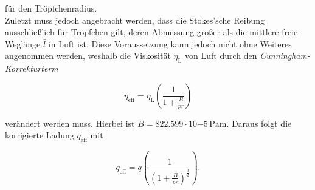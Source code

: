 \noindent für den Tröpfchenradius.\\

\noindent Zuletzt muss jedoch angebracht werden, dass die Stokes'sche Reibung ausschließlich für Tröpfchen gilt, deren Abmessung
größer als die mittlere freie Weglänge $\bar{l}$ in Luft ist. Diese Voraussetzung kann jedoch nicht ohne Weiteres
angenommen werden, weshalb die Viskosität $\eta_\text{L}$ von Luft durch den \emph{Cunningham-Korrekturterm} 

\begin{equation*}
    \eta_\text{eff} = \eta_\text{L}\left(\frac{1}{1 + \frac{B}{pr}}\right)
\end{equation*}

\noindent verändert werden muss. Hierbei ist $B = 822.599\cdot{}10{-5}\,\unit{\pascal\meter}$. Daraus folgt die korrigierte 
Ladung $q_\text{eff}$ mit 

\begin{equation}
\label{eqn:cunningLad}
    q_\text{eff} = q\left(\frac{1}{\left(1+\frac{B}{pr}\right)^{\frac{3}{2}}}\right).
\end{equation}

%


